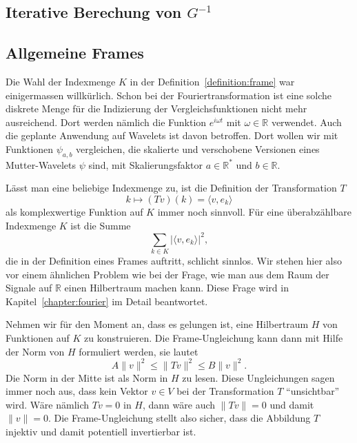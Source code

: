 \subsection{Iterative Berechung von $G^{-1}$
\label{subsection:graminverse}}



%
%
\subsection{Allgemeine Frames}
Die Wahl der Indexmenge $K$ in der Definition~\ref{definition:frame}
war einigermassen willkürlich.
Schon bei der Fouriertransformation ist eine solche diskrete Menge
für die Indizierung der Vergleichsfunktionen nicht mehr ausreichend.
Dort werden nämlich die Funktion $e^{i\omega t}$ mit $\omega\in\mathbb R$
verwendet.
Auch die geplante Anwendung auf Wavelets ist davon betroffen.
Dort wollen wir mit Funktionen $\psi_{a,b}$ vergleichen, die 
skalierte und verschobene Versionen eines Mutter-Wavelets $\psi$ sind,
mit Skalierungsfaktor $a\in\mathbb R^*$ und $b\in \mathbb R$.

Lässt man eine beliebige Indexmenge zu, ist die Definition der
Transformation $T$
\[
k
\mapsto
(Tv)(k) = \langle v,e_k\rangle
\]
als komplexwertige Funktion auf $K$ immer noch sinnvoll.
Für eine überabzählbare Indexmenge $K$ ist die Summe 
\[
\sum_{k\in K} |\langle v,e_k\rangle|^2,
\]
die in der Definition eines Frames auftritt, schlicht sinnlos.
Wir stehen hier also vor einem ähnlichen Problem wie bei der Frage,
wie man aus dem Raum der Signale auf $\mathbb R$ einen Hilbertraum machen kann.
Diese Frage wird in Kapitel~\ref{chapter:fourier} im Detail beantwortet.

Nehmen wir für den Moment an, dass es gelungen ist, eine Hilbertraum $H$
von Funktionen auf $K$ zu konstruieren.
Die Frame-Ungleichung kann dann mit Hilfe der Norm von $H$ formuliert
werden, sie lautet
\[
A\|v\|^2 \le \|Tv\|^2 \le B\|v\|^2.
\]
Die Norm in der Mitte ist als Norm in $H$ zu lesen.
Diese Ungleichungen sagen immer noch aus, dass kein Vektor $v\in V$ bei
der Transformation $T$ ``unsichtbar'' wird.
Wäre nämlich $Tv=0$ in $H$, dann wäre auch $\|Tv\|=0$ und damit
$\|v\|=0$.
Die Frame-Ungleichung stellt also sicher, dass die Abbildung $T$ 
injektiv und damit potentiell invertierbar ist.

